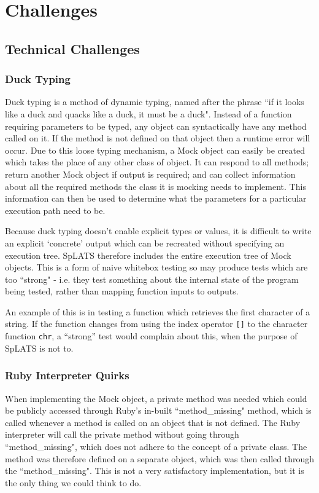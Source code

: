 \chapter{Challenges}
\section{Technical Challenges}
  \subsection{Duck Typing}
    Duck typing is a method of dynamic typing, named after the phrase ``if it looks like a duck and quacks like a duck, it must be a duck". Instead of a function requiring parameters to be typed, any object can syntactically have any method called on it. If the method is not defined on that object then a runtime error will occur. Due to this loose typing mechanism, a Mock object can easily be created which takes the place of any other class of object. It can respond to all methods; return another Mock object if output is required; and can collect information about all the required methods the class it is mocking needs to implement. This information can then be used to determine what the parameters for a particular execution path need to be.
    
    Because duck typing doesn't enable explicit types or values, it is difficult to write an explicit `concrete' output which can be recreated without specifying an execution tree. SpLATS therefore includes the entire execution tree of Mock objects. This is a form of naive whitebox testing so may produce tests which are too ``strong" - i.e. they test something about the internal state of the program being tested, rather than mapping function inputs to outputs.
    
    An example of this is in testing a function which retrieves the first character of a string. If the function changes from using the index operator \texttt{[]} to the character function \texttt{chr}, a ``strong'' test would complain about this, when the purpose of SpLATS is not to.
    
  \subsection{Ruby Interpreter Quirks}
    When implementing the Mock object, a private method was needed which could be publicly accessed through Ruby's in-built ``method\_missing" method, which is called whenever a method is called on an object that is not defined. The Ruby interpreter will call the private method without going through ``method\_missing", which does not adhere to the concept of a private class. The method was therefore defined on a separate object, which was then called through the ``method\_missing". This is not a very satisfactory implementation, but it is the only thing we could think to do.
    
